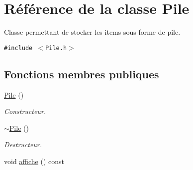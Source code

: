 \hypertarget{class_pile}{
\section{Référence de la classe Pile}
\label{class_pile}
}
Classe permettant de stocker les items sous forme de pile.  


{\tt \#include $<$Pile.h$>$}

\subsection*{Fonctions membres publiques}
\begin{CompactItemize}
\item 
\hypertarget{class_pile_b44e927107b28f5f3ac7697d10e0a739}{
\hyperlink{class_pile_b44e927107b28f5f3ac7697d10e0a739}{Pile} ()}
\label{class_pile_b44e927107b28f5f3ac7697d10e0a739}

\begin{CompactList}\small\item\em Constructeur. \item\end{CompactList}\item 
\hypertarget{class_pile_b2d1398d675586ff34994e2b109df152}{
\hyperlink{class_pile_b2d1398d675586ff34994e2b109df152}{$\sim$Pile} ()}
\label{class_pile_b2d1398d675586ff34994e2b109df152}

\begin{CompactList}\small\item\em Destructeur. \item\end{CompactList}\item 
\hypertarget{class_pile_874f209b5333810e6179b0061304b4e5}{
void \hyperlink{class_pile_874f209b5333810e6179b0061304b4e5}{affiche} () const }
\label{class_pile_874f209b5333810e6179b0061304b4e5}


\end{CompactItemize}
